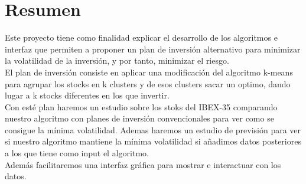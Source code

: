 \documentclass[12pt,a4paper]{article}
\begin{document}
	\section{Resumen}
	\vspace{1cm}
Este proyecto tiene como finalidad explicar el desarrollo de los algoritmos e interfaz que permiten a \cite{Princial} proponer un plan de inversión alternativo para minimizar la volatilidad de la inversión, y por tanto, minimizar el riesgo.\\
El plan de inversión consiste en aplicar una modificación del algoritmo k-means para agrupar los stocks en k clusters y de esos clusters sacar un optimo, dando lugar a k stocks diferentes en los que invertir.\\
Con esté plan haremos un estudio sobre los stoks del IBEX-35 comparando nuestro algoritmo con planes de inversión convencionales para ver como se consigue la mínima volatilidad. Ademas haremos un estudio de previsión para ver si nuestro algoritmo mantiene la mínima volatilidad si añadimos datos posteriores a los que tiene como input el algoritmo.\\
Además facilitaremos una interfaz gráfica para mostrar e interactuar con los datos.\\
\pagebreak
	\vspace{1cm}
\end{document}
